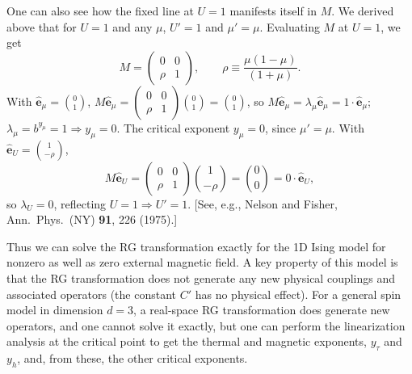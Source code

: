 One can also see how the fixed line at $U = 1$ manifests itself in $M$. We derived above that for $U = 1$ and
any $\mu$, $U' = 1$ and $\mu' = \mu$. Evaluating $M$ at $U = 1$, we get
\begin{equation}
  M = \begin{pmatrix}0 & 0\\ \rho & 1\end{pmatrix},\qquad \rho\equiv\frac{\mu(1-\mu)}{(1+\mu)} .
\end{equation}
With $\hat{\mathbf e}_\mu = \binom01$, $M\hat{\mathbf e}_\mu = \left(\begin{smallmatrix}0&0\\ \rho&1\end{smallmatrix}\right)\binom01 = \binom01$,
so $M\hat{\mathbf e}_\mu = \lambda_\mu\hat{\mathbf e}_\mu = 1\cdot\hat{\mathbf e}_\mu$; $\lambda_\mu = b^{y_\mu} = 1\Rightarrow y_\mu = 0$.
The critical exponent $y_\mu = 0$, since $\mu' = \mu$. With $\hat{\mathbf e}_U = \binom{1}{-\rho}$,
\begin{equation}
  M\hat{\mathbf e}_U = \begin{pmatrix}0 & 0\\ \rho & 1\end{pmatrix}\binom{1}{-\rho} = \binom00 = 0\cdot\hat{\mathbf e}_U,
\end{equation}
so $\lambda_U = 0$, reflecting $U = 1\Rightarrow U' = 1$. [See, e.g., Nelson and Fisher, Ann.\ Phys.\ (NY)
\textbf{91}, 226 (1975).]

Thus we can solve the RG transformation exactly for the 1D Ising model for nonzero as well as zero external
magnetic field. A key property of this model is that the RG transformation does not generate any new physical
couplings and associated operators (the constant $C'$ has no physical effect). For a general spin model in
dimension $d = 3$, a real-space RG transformation does generate new operators, and one cannot solve it
exactly, but one can perform the linearization analysis at the critical point to get the thermal and magnetic
exponents, $y_\tau$ and $y_h$, and, from these, the other critical exponents.
